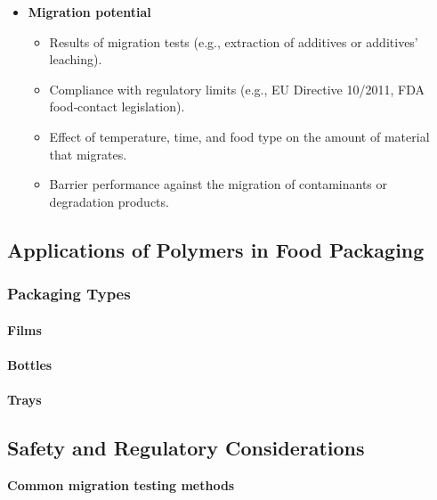 \begin{itemize}
\item 
\textbf{Migration potential}
  \begin{itemize}
\item Results of migration tests (e.g., extraction of additives or additives’ leaching).
\item Compliance with regulatory limits (e.g., EU Directive 10/2011, FDA food‑contact legislation).
\item Effect of temperature, time, and food type on the amount of material that migrates.
\item Barrier performance against the migration of contaminants or degradation products.
  \end{itemize}
\end{itemize}

\subsection{Applications of Polymers in Food Packaging}

\subsubsection{Packaging Types}

\paragraph{Films}

\paragraph{Bottles}

\paragraph{Trays}

\subsection{Safety and Regulatory Considerations}

\textbf{Common migration testing methods}

